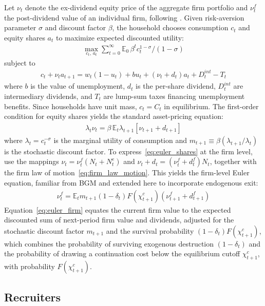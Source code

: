 \documentclass[authoryear, review, 12pt]{elsarticle}
\begin{document}
	Let $\nu_t$ denote the ex-dividend equity price of the aggregate 
	firm portfolio and $\nu_t^f$ the post-dividend value of an 
	individual firm, following \citet{bilbiie_2012}. Given 
	risk-aversion parameter $\sigma$ and discount factor $\beta$, 
	the household chooses consumption $c_t$ and equity shares $a_t$ 
	to maximize expected discounted utility:
	\begin{align}
		\max_{c_t,\,a_t}\sum_{t=0}^{\infty}
		\mathbb{E}_0\,\beta^t c_t^{1-\sigma}/(1-\sigma)
	\end{align}
	subject to
	\begin{align}\label{eq:bc_HH}
		c_t + \nu_t a_{t+1} = w_t(1-u_t) + b u_t 
		+ (\nu_t+d_t)a_t + D_t^{int} - T_t
	\end{align}
	where $b$ is the value of unemployment, $d_t$ is the per-share 
	dividend, $D_t^{int}$ are intermediary dividends, and $T_t$ are 
	lump-sum taxes financing unemployment benefits. Since households 
	have unit mass, $c_t = C_t$ in equilibrium. The first-order 
	condition for equity shares yields the standard asset-pricing 
	equation:
	\begin{align}\label{eq:euler_shares}
		\lambda_t \nu_t = \beta\,\mathbb{E}_t\lambda_{t+1}
		[\nu_{t+1}+d_{t+1}]
	\end{align}
	where $\lambda_t = c_t^{-\sigma}$ is the marginal utility of 
	consumption and $m_{t+1}\equiv\beta(\lambda_{t+1}/\lambda_t)$ 
	is the stochastic discount factor. To express~\eqref{eq:euler_shares} 
	at the firm level, use the mappings $\nu_t=\nu_t^f(N_t+N_t^e)$ 
	and $\nu_t+d_t=(\nu_t^f+d_t^f)N_t$, together with the firm law 
	of motion~\eqref{eq:firm_law_motion}. This yields the firm-level 
	Euler equation, familiar from BGM and extended here to 
	incorporate endogenous exit:
	\begin{align}\label{eq:euler_firm}
		\nu_t^f = \mathbb{E}_t m_{t+1}(1-\delta_t)F(\chi_{t+1}^c)
		(\nu_{t+1}^f+d_{t+1}^f)
	\end{align}
	Equation~\eqref{eq:euler_firm} equates the current firm value to 
	the expected discounted sum of next-period firm value and 
	dividends, adjusted for the stochastic discount factor 
	$m_{t+1}$ and the survival probability $(1-\delta_t)F(\chi_{t+1}^c)$, 
	which combines the probability of surviving exogenous destruction 
	$(1-\delta_t)$ and the probability of drawing a continuation 
	cost below the equilibrium cutoff $\chi_{t+1}^c$, with probability $F(\chi_{t+1}^c)$.
	
	\subsection{Recruiters}
	\label{sec:recruiters}
	
\end{document}
